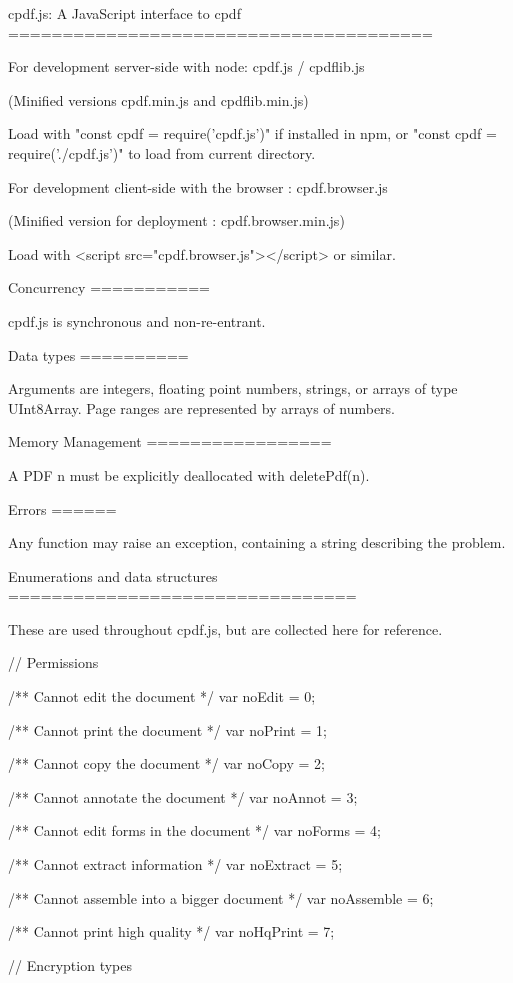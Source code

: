 cpdf.js: A JavaScript interface to cpdf
=======================================

For development server-side with node: cpdf.js / cpdflib.js

(Minified versions cpdf.min.js and cpdflib.min.js)

Load with "const cpdf = require('cpdf.js')" if installed in npm, or "const cpdf
= require('./cpdf.js')" to load from current directory.

For development client-side with the browser : cpdf.browser.js

(Minified version for deployment : cpdf.browser.min.js)

Load with <script src="cpdf.browser.js"></script> or similar.


Concurrency
===========

cpdf.js is synchronous and non-re-entrant.


Data types
==========

Arguments are integers, floating point numbers, strings, or arrays of type
UInt8Array. Page ranges are represented by arrays of numbers.


Memory Management
=================

A PDF n must be explicitly deallocated with deletePdf(n).


Errors
======

Any function may raise an exception, containing a string describing the problem. 


Enumerations and data structures
================================

These are used throughout cpdf.js, but are collected here for reference.


// Permissions

/** Cannot edit the document */
var noEdit = 0;

/** Cannot print the document */
var noPrint = 1;

/** Cannot copy the document */
var noCopy = 2;

/** Cannot annotate the document */
var noAnnot = 3;

/** Cannot edit forms in the document */
var noForms = 4;

/** Cannot extract information */
var noExtract = 5;

/** Cannot assemble into a bigger document */
var noAssemble = 6;

/** Cannot print high quality */
var noHqPrint = 7;


// Encryption types

